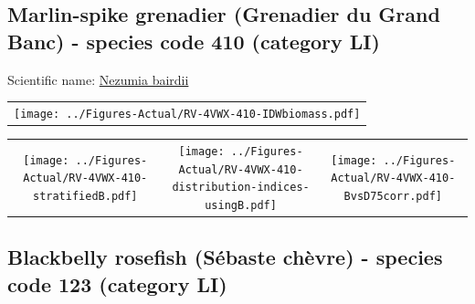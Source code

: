 \documentclass[12pt]{article}\usepackage[]{graphicx}\usepackage[]{color}
\begin{document}
\renewcommand\thefigure{\thesubsection\Alph{figure}}

\setcounter{figure}{0}

\hypertarget{sec:410}{%
\subsection{Marlin-spike grenadier (Grenadier du Grand Banc) - species code 410 (category LI)}\label{sec:410}}

  


Scientific name: \href{http://www.marinespecies.org/aphia.php?p=taxdetails\&id=183289}{Nezumia bairdii} \newline
\begin{minipage}{1.0\textwidth}
 \begin{tabular}{c}
\texttt{[image: ../Figures-Actual/RV-4VWX-410-IDWbiomass.pdf]} \\ 
\end{tabular} 
\end{minipage}
\newline

\vspace{1cm}
\begin{minipage}{1.0\textwidth}
 \begin{tabular}{ccc}
\texttt{[image: ../Figures-Actual/RV-4VWX-410-stratifiedB.pdf]} & 
\texttt{[image: ../Figures-Actual/RV-4VWX-410-distribution-indices-usingB.pdf]} & 
\texttt{[image: ../Figures-Actual/RV-4VWX-410-BvsD75corr.pdf]} \\ 
\end{tabular} 
\end{minipage}
\clearpage

\renewcommand\thefigure{\thesubsection\Alph{figure}}

\setcounter{figure}{0}

\hypertarget{sec:123}{%
\subsection{Blackbelly rosefish (Sébaste chèvre) - species code 123 (category LI)}\label{sec:123}}
\end{document}
